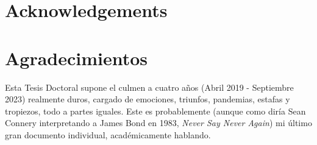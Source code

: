 %
%
%
% 
%
%
%
%

\thispagestyle{empty}

{
  \chapter*{Acknowledgements}
  \label{cha:acknowledgements}
}
{
  \chapter*{Agradecimientos}
  \label{cha:agradecimientos}
}


Esta Tesis Doctoral supone el culmen a cuatro años (Abril 2019 - Septiembre 2023) realmente duros, cargado de emociones, triunfos, pandemias, estafas y tropiezos, todo a partes iguales. Este es probablemente (aunque como diría Sean Connery interpretando a James Bond en 1983, \textit{Never Say Never Again}) mi último gran documento individual, académicamente hablando.


